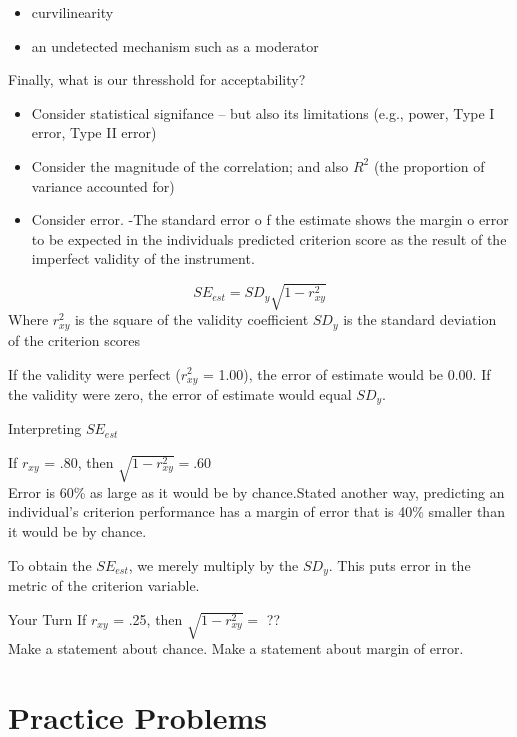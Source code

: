 \documentclass[
  english,
]{book}
\providecommand{\tightlist}{%
  \setlength{\itemsep}{0pt}\setlength{\parskip}{0pt}}
\begin{document}
\begin{itemize}
\tightlist
\item
  curvilinearity
\item
  an undetected mechanism such as a moderator
\end{itemize}

Finally, what is our thresshold for acceptability?

\begin{itemize}
\tightlist
\item
  Consider statistical signifance -- but also its limitations (e.g., power, Type I error, Type II error)
\item
  Consider the magnitude of the correlation; and also \(R^2\) (the proportion of variance accounted for)
\item
  Consider error.
  -The standard error o f the estimate shows the margin o error to be expected in the individuals predicted criterion score as the result of the imperfect validity of the instrument.
\end{itemize}

\[SE_{est} = SD_{y}\sqrt{1 - r_{xy}^{2}}\]
Where
\(r_{xy}^{2}\) is the square of the validity coefficient
\(SD_{y}\) is the standard deviation of the criterion scores

If the validity were perfect (\(r_{xy}^{2}\) = 1.00), the error of estimate would be 0.00.
If the validity were zero, the error of estimate would equal \(SD_{y}\).

Interpreting \(SE_{est}\)

If \(r_{xy}\) = .80, then \(\sqrt{1 - r_{xy}^{2}} = .60\)\\
Error is 60\% as large as it would be by chance.Stated another way, predicting an individual's criterion performance has a margin of error that is 40\% smaller than it would be by chance.

To obtain the \(SE_{est}\), we merely multiply by the \(SD_{y}\). This puts error in the metric of the criterion variable.

Your Turn
If \(r_{xy}\) = .25, then \(\sqrt{1 - r_{xy}^{2}} =\) ??\\
Make a statement about chance.
Make a statement about margin of error.

\hypertarget{practice-problems-2}{%
\section{Practice Problems}\label{practice-problems-2}}
\end{document}
